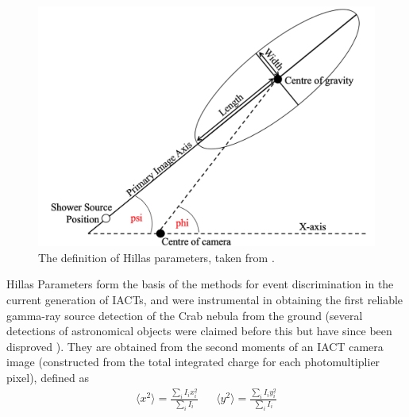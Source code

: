 \begin{figure}[ht] 
        \centering \includegraphics[width=\columnwidth]{figures/hillas.png}
        \caption{
                \label{fig:hillas} %
                The definition of Hillas parameters, taken from \cite{ctapipe}.
        }
\end{figure}
Hillas Parameters form the basis of the methods for event discrimination in the current generation of IACTs, and were instrumental in obtaining the first reliable gamma-ray source detection of the Crab nebula from the ground \cite{whipple} (several detections of astronomical objects were claimed before this but have since been disproved \cite{hintonicrc30,paulathesis}). They are obtained \cite{tomthesis,weekestev} from the second moments of an IACT camera image (constructed from the total integrated charge for each photomultiplier pixel), defined as 
\begin{align*}
\langle x^2 \rangle = \frac{\sum_i I_i x_i^2}{\sum_i I_i} && \langle y^2 \rangle = \frac{\sum_i I_i y_i^2}{\sum_i I_i}
\end{align*}
